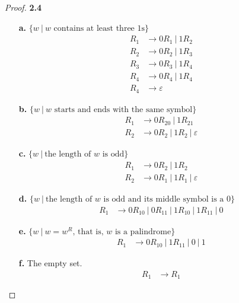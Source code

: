 \documentclass[11pt]{article}
\theoremstyle{definition}
\begin{document}
\begin{proof}{\textbf{2.4}}
    \begin{itemize}
        \item [\textbf{a.}] $\{w ~|~w \text{ contains at least three 1s}\}$
        \begin{align*}
            R_1 &\to 0R_1~|~1R_2\\
            R_2 &\to 0R_2~|~1R_3\\
            R_3 &\to 0R_3~|~1R_4\\
            R_4 &\to 0R_4~|~1R_4\\
            R_4 &\to \varepsilon
        \end{align*}
        \item [\textbf{b.}]
        $\{w ~|~w \text{ starts and ends with the same symbol}\}$
        \begin{align*}
            R_1 &\to 0R_20~|~1R_21\\
            R_2 &\to 0R_2~|~1R_2~|~\varepsilon
        \end{align*}
        \item [\textbf{c.}]
        $\{w ~|~\text{the length of $w$ is odd}\}$
        \begin{align*}
            R_1 &\to 0R_2~|~1R_2\\
            R_2 &\to 0R_1~|~1R_1~|~\varepsilon
        \end{align*}
        \item [\textbf{d.}]
        $\{w ~|~\text{the length of $w$ is odd and its middle symbol is a $0$}\}$
        \begin{align*}
            R_1 &\to 0R_10~|~0R_11~|~1R_10~|~1R_11~|~0
        \end{align*}
        \item [\textbf{e.}]
        $\{w ~|~w=w^R \text{, that is, $w$ is a palindrome}\}$
        \begin{align*}
            R_1 &\to 0R_10~|~1R_11~|~0~|~1
        \end{align*}
        \item [\textbf{f.}]
        The empty set.
        \begin{align*}
            R_1 &\to R_1
        \end{align*}
    \end{itemize}
\end{proof}
\cleardoublepage
\end{document}
